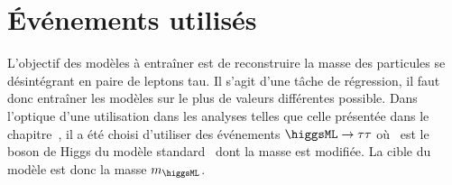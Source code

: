 \section{Événements utilisés}\label{chapter-ML-section-evt_gen}




L'objectif des modèles à entraîner est de reconstruire la masse des particules se désintégrant en paire de leptons tau.
Il s'agit d'une tâche de régression, il faut donc entraîner les modèles sur le plus de valeurs différentes possible.
Dans l'optique d'une utilisation dans les analyses telles que celle présentée dans le chapitre~,
il a été choisi d'utiliser des événements
$\higgsML\to\tau\tau$
où \higgsML\ est le boson de Higgs du modèle standard \higgs\ dont la masse est modifiée.
La cible du modèle est donc la masse $m_{\higgsML}$.
